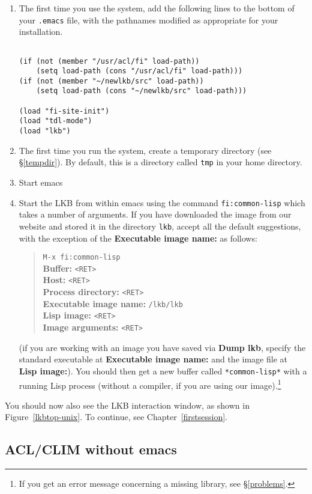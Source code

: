 \documentclass[12pt]{report}
\begin{document}
\begin{enumerate}
\item The first time you use the system,
add the following lines to the bottom of your {\tt .emacs}
file, with the pathnames modified as appropriate for your
installation.
\begin{verbatim}

(if (not (member "/usr/acl/fi" load-path))
    (setq load-path (cons "/usr/acl/fi" load-path)))
(if (not (member "~/newlkb/src" load-path))
    (setq load-path (cons "~/newlkb/src" load-path)))
	
(load "fi-site-init")
(load "tdl-mode")
(load "lkb")
\end{verbatim}
\item The first time you run the system,
create a temporary directory (see \S\ref{tempdir}).  By default, this is
a directory called {\tt tmp} in your home directory.
\item Start emacs
\item Start the LKB from within emacs using the 
command \verb+fi:common-lisp+ which takes a number
of arguments.  If you have downloaded the image from our website
and stored it in the directory {\tt lkb}, accept all the default
suggestions, with the exception of the {\bf Executable image name:}
as follows:
\begin{quote}
\verb+M-x fi:common-lisp+\\
{\bf Buffer:} \verb+<RET>+\\
{\bf Host:} \verb+<RET>+\\
{\bf Process directory:} \verb+<RET>+\\
{\bf Executable image name:} \verb+/lkb/lkb+\\
{\bf Lisp image:}  \verb+<RET>+\\
{\bf Image arguments:}  \verb+<RET>+
\end{quote}
(if you are working with an image you have saved via {\bf Dump lkb}, 
specify the standard executable at
{\bf Executable image name:} and the image file at {\bf Lisp image:}).
You should then get a new buffer called \verb+*common-lisp*+ with
a running Lisp process (without a compiler, if you are using our
image).\footnote{If you get an error message concerning a missing library,
see \S\ref{problems}.}
\end{enumerate}
You
should now also see the LKB interaction window, as shown in 
Figure~\ref{lkbtop-unix}.
To continue, see Chapter~\ref{firstsession}.


\subsection{ACL/CLIM without emacs}
\label{clim-image}
\end{document}
